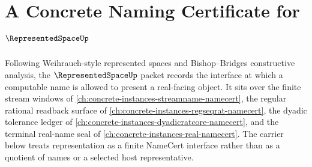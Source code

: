 \chapter{A Concrete Naming Certificate for $\RepresentedSpaceUp$}
\label{ch:concrete-instances-representedspace-namecert}

Following Weihrauch-style represented spaces and Bishop--Bridges constructive
analysis, the $\RepresentedSpaceUp$ packet records the interface at which a
computable name is allowed to present a real-facing object. It sits over the
finite stream windows of \autoref{ch:concrete-instances-streamname-namecert},
the regular rational readback surface of
\autoref{ch:concrete-instances-regseqrat-namecert}, the dyadic tolerance ledger
of \autoref{ch:concrete-instances-dyadicratcore-namecert}, and the terminal
real-name seal of \autoref{ch:concrete-instances-real-namecert}. The carrier
below treats representation as a finite NameCert interface rather than as a
quotient of names or a selected host representative.

